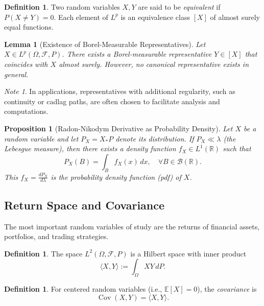\documentclass[11pt,reqno]{amsart}
\newtheorem{lemma}[theorem]{Lemma}
\newtheorem{proposition}[theorem]{Proposition}
\theoremstyle{definition}
\newtheorem{definition}[theorem]{Definition}
\theoremstyle{remark}
\newtheorem*{note}{Note}
\begin{document}
\begin{definition}
	Two random variables $X, Y$ are said to be \emph{equivalent} if $P(X \neq Y)=0$. Each element of $L^p$ is an equivalence class $[X]$ of almost surely equal functions.
\end{definition}

\begin{lemma}[Existence of Borel-Measurable Representatives]
	Let $X \in L^p(\Omega, \mathcal{F}, P)$. There exists a Borel-measurable representative $Y \in [X]$ that coincides with $X$ almost surely. However, no canonical representative exists in general.
\end{lemma}

\begin{note}
	In applications, representatives with additional regularity, such as continuity or cadlag paths, are often chosen to facilitate analysis and computations.
\end{note}

\begin{proposition}[Radon-Nikodym Derivative as Probability Density]
	Let $X$ be a random variable and let $P_X = X_*P$ denote its distribution. If $P_X \ll \lambda$ (the Lebesgue measure), then there exists a density function $f_X \in L^1(\mathbb{R})$ such that
	\[
		P_X(B) = \int_B f_X(x) \, dx, \quad \forall B \in \mathcal{B}(\mathbb{R}).
	\]
	This $f_X = \frac{dP_X}{d\lambda}$ is the \emph{probability density function} (pdf) of $X$.
\end{proposition}

\subsection{Return Space and Covariance}

The most important random variables of study are the returns of financial assets, portfolios, and trading strategies.

\begin{definition}
	The space $L^2(\Omega, \mathcal{F}, P)$ is a Hilbert space with inner product
	\[
		\langle X, Y \rangle := \int_\Omega X Y \, dP.
	\]
\end{definition}

\begin{definition}
	For centered random variables (i.e., $\mathbb{E}[X]=0$), the \emph{covariance} is
	\[
		\operatorname{Cov}(X, Y) = \langle X, Y \rangle.
	\]
\end{definition}
\end{document}
